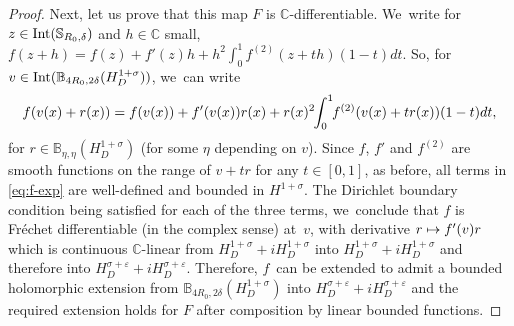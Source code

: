 \documentclass[10pt]{amsart}
\newcommand\mto{\mathchoice{\longmapsto}{\mapsto}{\mapsto}{\mapsto}}
\theoremstyle{definition}
\let\veps\varepsilon
\providecommand{\Int}[1]{\textup{Int}(#1)}
\begin{document}
\begin{proof}
Next, let us prove that this map $F$ is $\mathbb{C}$-differentiable. We~write for $z\in \Int{\mathbb{S}_{R_0, \delta}}$ and $h\in\mathbb{C}$ small, $f(z+h)=f(z)+f'(z)h+h^2\int_0^1f^{(2)}(z+th)(1-t)dt$. So, for $v\in \Int{\mathbb{B}_{4R_0, 2\delta}(H^{1+\sigma}_D)} $, we~can write
\begin{align}\label{eq:f-exp}
f(v(x)+r(x))=f(v(x))+f'(v(x))r(x)+r(x)^2\hspace*{-1mm}\int_0^1\hspace*{-1mm}f^{(2)}(v(x)+tr(x))(1-t)dt,
\end{align}
for $r\in \mathbb{B}_{\eta, \eta}(H^{1+\sigma}_D)$ (for some $\eta$ depending on $v$). Since $f$, $f'$ and $f^{(2)}$ are smooth functions on the range of $v+tr$ for any $t\in [0,1]$, as before, all terms in \eqref{eq:f-exp} are well-defined and bounded in $H^{1+\sigma}$. The Dirichlet boundary condition being satisfied for each of the three terms, we~conclude that $f$ is Fréchet differentiable (in the complex sense) at~$v$, with derivative $r\mto f'(v)r$ which is continuous $\mathbb{C}$-linear from \hbox{$H^{1+\sigma}_D+iH^{1+\sigma}_D$} into $H^{1+\sigma}_D+iH^{1+\sigma}_D$ and therefore into $H^{\sigma+\veps}_D+iH^{\sigma+\veps}_D$. Therefore, $f$~can be extended to admit a bounded holomorphic extension from $\mathbb{B}_{4R_0, 2\delta}(H_D^{1+\sigma})$ into $H^{\sigma+\veps}_D+iH^{\sigma+\veps}_D$ and the required extension holds for $F$ after composition by linear bounded functions.
\end{proof}
\end{document}
